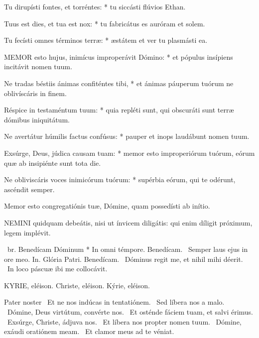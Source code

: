 Tu dirupísti fontes, et torréntes: * tu siccásti flúvios Ethan.

Tuus est dies, et tua est nox: * tu fabricátus es auróram et solem.

Tu fecísti omnes términos terræ: * æstátem et ver tu plasmásti ea.


\lettrine[lines=2]{M}{EMOR} esto hujus, inimícus improperávit Dómino: * et pópulus insípiens incitávit nomen tuum.

Ne tradas béstiis ánimas confiténtes tibi, * et ánimas páuperum tuórum ne oblivíscáris in finem.

Réspice in testaméntum tuum: * quia repléti sunt, qui obscuráti sunt terræ dómibus iniquitátum.

Ne avertátur húmilis factus confúsus: * pauper et inops laudábunt nomen tuum.

Exsúrge, Deus, júdica causam tuam: * memor esto improperiórum tuórum, eórum quæ ab insipiénte sunt tota die.

Ne obliviscáris voces inimicórum tuórum: * supérbia eórum, qui te odérunt, ascéndit semper.

 Memor esto congregatiónis tuæ, Dómine, quam possedísti ab inítio.



\lettrine[lines=2]{N}{EMINI} quidquam debeátis, nisi ut ínvicem diligátis: qui enim díligit próximum, legem implévit.

\R\ br. Benedícam Dóminum * In omni témpore. Benedícam. \V\ Semper laus ejus in ore meo. In. Glória Patri. Benedícam. \V\ Dóminus regit me, et nihil mihi déerit. \R\ In loco páscuæ ibi me collocávit.



KYRIE, eléison. Christe, eléison. Kýrie, eléison.

Pater noster  \V\ Et ne nos indúcas in tentatiónem. \R\ Sed líbera nos a malo. \V\ Dómine, Deus virtútum, convérte nos. \R\ Et osténde fáciem tuam, et salvi érimus. \V\ Exsúrge, Christe, ádjuva nos. \R\ Et líbera nos propter nomen tuum. \V\ Dómine, exáudi oratiónem meam. \R\ Et clamor meus ad te véniat.


